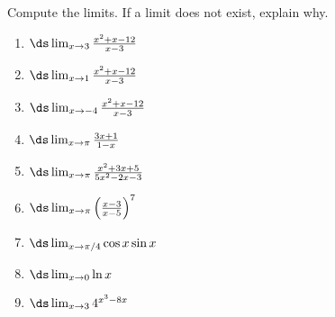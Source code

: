 \begin{enumialphparenastyle}
\begin{ex}
Compute the limits. If a limit does not exist, explain why.
\begin{multicols}{2}
\begin{enumerate}
	\item	$\ds \lim_{x\to 3}{x^2+x-12\over x-3}$
	\item	$\ds \lim_{x\to 1}{x^2+x-12\over x-3}$
	\item	$\ds \lim_{x\to -4}{x^2+x-12\over x-3}$
	\item {$\ds \lim_{x\to\pi}\frac{3x+1}{1-x}$}
	\item {$\ds \lim_{x\to\pi}\frac{x^2+3x+5}{5x^2-2x-3}$}
	
	\item {$\ds \lim_{x\to\pi}\left(\frac{x-3}{x-5}\right)^7$}

	\item {$\ds \lim_{x\to\pi/4}\cos x\sin x$}
	
	\item {$\ds \lim_{x\to0}\ln x$}

	\item  {$\ds \lim_{x\to3}4^{x^3-8x}$}


\end{enumerate}
\end{multicols}
\end{ex}
\end{enumialphparenastyle}
